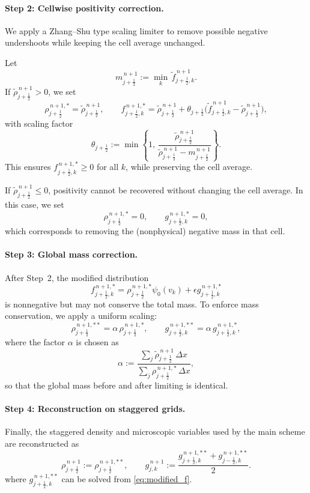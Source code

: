 \documentclass[11pt,twoside]{article}
\theoremstyle{nonumberplain}
\begin{document}
\paragraph{Step 2: Cellwise positivity correction.}
We apply a Zhang--Shu type scaling limiter to remove possible negative undershoots while keeping the cell average unchanged.

Let
\[
    m_{j+\frac12}^{\,n+1} := \min_{k}\, \tilde{f}_{j+\frac12,k}^{\,n+1}.
\]
If $\tilde{\rho}_{j+\frac12}^{\,n+1} > 0$, we set
\[
    \rho_{j+\frac12}^{\,n+1,*} = \tilde{\rho}_{j+\frac12}^{\,n+1}, \qquad
    f_{j+\frac12,k}^{\,n+1,*}
    = \tilde{\rho}_{j+\frac12}^{\,n+1} + \theta_{j+\frac12} \big(\tilde{f}_{j+\frac12,k}^{\,n+1} - \tilde{\rho}_{j+\frac12}^{\,n+1}\big),
\]
with scaling factor
\[
    \theta_{j+\frac12}
    := \min\left\{
        1,\,
        \frac{\tilde{\rho}_{j+\frac12}^{\,n+1}}
        {\tilde{\rho}_{j+\frac12}^{\,n+1} - m_{j+\frac12}^{\,n+1}}
    \right\}.
\]
This ensures $f_{j+\frac12,k}^{\,n+1,*} \ge 0$ for all $k$, while preserving the cell average.

If $\tilde{\rho}_{j+\frac12}^{\,n+1}\le 0$, positivity cannot be recovered without changing the cell average.  
In this case, we set
\[
    \rho_{j+\frac12}^{\,n+1,*}=0,\qquad
    g_{j+\frac12,k}^{\,n+1,*}=0,
\]
which corresponds to removing the (nonphysical) negative mass in that cell.

\paragraph{Step 3: Global mass correction.}
After Step~2, the modified distribution
\begin{equation}\label{eq:modified_f}
    f_{j+\frac12,k}^{\,n+1,*}
    = \rho_{j+\frac12}^{\,n+1,*}\psi_0(v_k)
    + \epsilon g_{j+\frac12,k}^{\,n+1,*}
\end{equation}
is nonnegative but may not conserve the total mass.  
To enforce mass conservation, we apply a uniform scaling:
\[
    \rho_{j+\frac12}^{\,n+1,**} = \alpha\,\rho_{j+\frac12}^{\,n+1,*},
    \qquad
    g_{j+\frac12,k}^{\,n+1,**} = \alpha\,g_{j+\frac12,k}^{\,n+1,*},
\]
where the factor $\alpha$ is chosen as
\[
    \alpha
    := \frac{\displaystyle\sum_{j}\tilde{\rho}_{j+\frac12}^{\,n+1}\,\Delta x}
            {\displaystyle\sum_{j}\rho_{j+\frac12}^{\,n+1,*}\,\Delta x},
\]
so that the global mass before and after limiting is identical.

\paragraph{Step 4: Reconstruction on staggered grids.}
Finally, the staggered density and microscopic variables used by the main scheme are reconstructed as
\[
    \rho_{j+\frac12}^{\,n+1}
    := \rho_{j+\frac12}^{\,n+1,**},
    \qquad
    g_{j,k}^{\,n+1} := \frac{g_{j+\frac12,k}^{\,n+1,**}+g_{j-\frac12,k}^{\,n+1,**}}{2}.
\]
where $g_{j+\frac12,k}^{\,n+1,**}$ can be solved from \eqref{eq:modified_f}. 
\end{document}
